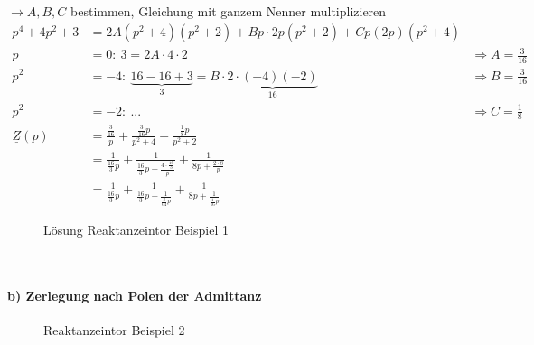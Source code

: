 $\rightarrow A,B,C$ bestimmen, Gleichung mit ganzem Nenner multiplizieren\\
\begin{align}
p^4+4p^2+3&=2A(p^2+4)(p^2+2)+Bp\cdot 2p(p^2+2)+Cp(2p)(p^2+4)\nonumber\\
p&=0:\ 3=2A\cdot 4 \cdot 2 &\Rightarrow A=\frac{3}{16}\nonumber\\
p^2&=-4:\ \underbrace{16-16+3}_{3}=B\cdot \underbrace{2\cdot (-4)(-2)}_{16}
&\Rightarrow B=\frac{3}{16}\nonumber\\ 
p^2&=-2:\ ... &\Rightarrow C=\frac{1}{8}\nonumber\\
\underline{Z}(p)&=\frac{\frac{3}{16}}{p}+\frac{\frac{3}{16}p}{p^2+4}+\frac{\frac{1}{8}p}{p^2+2}\nonumber\\
&=\frac{1}{\frac{16}{3}p}+\frac{1}{\frac{16}{3}p+\frac{4\cdot\frac{16}{3}}{p}}+\frac{1}{8p+\frac{2\cdot8}{p}}\nonumber\\
&=\frac{1}{\frac{16}{3}p}+\frac{1}{\frac{16}{3}p+\frac{1}{\frac{3}{64}p}}+\frac{1}{8p+\frac{1}{\frac{1}{16}p}}\nonumber
\end{align}
\begin{figure}[!h]
	\centering
	
	\caption{Lösung Reaktanzeintor Beispiel 1}
	\label{fig:RetSyntheseBsp1SL}
\end{figure}\\


\paragraph{b) Zerlegung nach Polen der Admittanz}
\begin{figure}[!h]
	\centering
	
	\caption{Reaktanzeintor Beispiel 2}
	\label{fig:RetSyntheseBsp2}
\end{figure}

